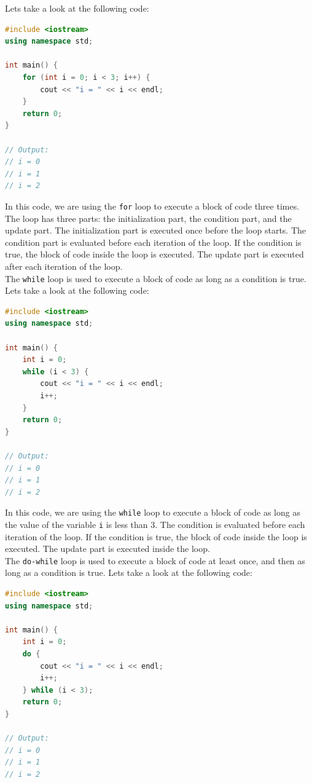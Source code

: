 Lets take a look at the following code:

\begin{lstlisting}[language=C++]
#include <iostream>
using namespace std;

int main() {
    for (int i = 0; i < 3; i++) {
        cout << "i = " << i << endl;
    }
    return 0;
}

// Output:
// i = 0
// i = 1
// i = 2
\end{lstlisting}

In this code, we are using the \texttt{for} loop to execute a block of code three times. The loop has three parts: the
initialization part, the condition part, and the update part. The initialization part is executed once before the loop
starts. The condition part is evaluated before each iteration of the loop. If the condition is true, the block of code
inside the loop is executed. The update part is executed after each iteration of the loop.\\

The \texttt{while} loop is used to execute a block of code as long as a condition is true. Lets take a look at the
following code:

\begin{lstlisting}[language=C++]
#include <iostream>
using namespace std;

int main() {
    int i = 0;
    while (i < 3) {
        cout << "i = " << i << endl;
        i++;
    }
    return 0;
}

// Output:
// i = 0
// i = 1
// i = 2
\end{lstlisting}

In this code, we are using the \texttt{while} loop to execute a block of code as long as the value of the variable \texttt{i}
is less than 3. The condition is evaluated before each iteration of the loop. If the condition is true, the block of code
inside the loop is executed. The update part is executed inside the loop.\\

The \texttt{do-while} loop is used to execute a block of code at least once, and then as long as a condition is true. Lets
take a look at the following code:

\begin{lstlisting}[language=C++]
#include <iostream>
using namespace std;

int main() {
    int i = 0;
    do {
        cout << "i = " << i << endl;
        i++;
    } while (i < 3);
    return 0;
}

// Output:
// i = 0
// i = 1
// i = 2
\end{lstlisting}

